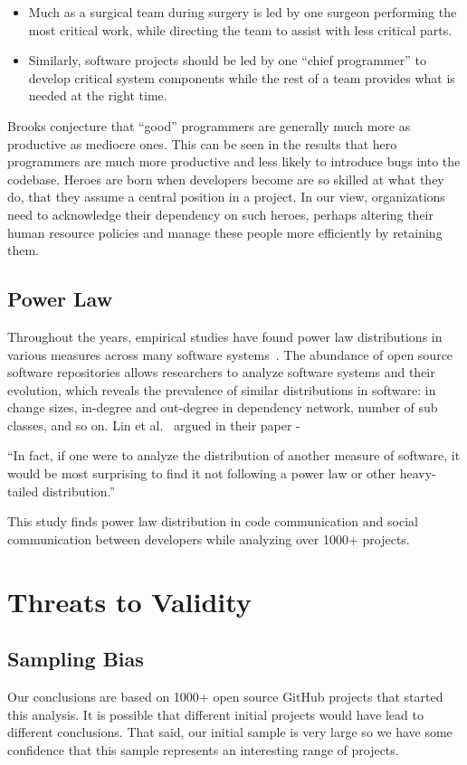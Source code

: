 \documentclass[smallextended]{svjour3}
\begin{document}
\begin{itemize}
  \item  Much as a surgical team during surgery is led by one surgeon performing the most critical work, while directing the team to assist with less critical parts.
  
  \item Similarly, software projects should be led by one ``chief programmer'' to  develop critical system components while the rest of a team provides what is needed at the right time.
\end{itemize}
Brooks conjecture that ``good'' programmers are generally much more as productive as mediocre ones. This can be seen in the results that hero programmers are much more productive and less likely to introduce bugs into the codebase.
Heroes are born when developers become are so skilled at what they do, that  they assume a central position in a project.
In our view,  organizations need to acknowledge their dependency on such heroes, perhaps altering their human resource policies and manage these people more efficiently by retaining them.

\subsection{Power Law}
Throughout the years, empirical studies have found power law distributions in various measures across many software systems~\cite{louridas2008power,concas2007power,wheeldon2003power,lin2015power,madey2002open}. The abundance of open source software repositories allows researchers to  analyze software systems and their evolution, which reveals the prevalence of similar distributions in software: in change sizes, in-degree and out-degree in dependency network, number of sub classes, and so on. Lin et al.~\cite{lin2015power} argued in their paper - 

``In fact, if one were to analyze the distribution of another measure of software, it would be most surprising to find it not following a power law or other heavy-tailed distribution.''

This study finds power law distribution in code communication and social communication between developers while analyzing over 1000+ projects.


\section{Threats to Validity}
\label{sec:Threats to Validity}
  \subsection{Sampling Bias} Our conclusions are based on 1000+ open source GitHub projects that started this analysis.  It is possible that   different initial projects would have lead to different conclusions. That said, our initial sample is very large so we have some confidence that this sample represents an interesting range of projects.  
            
\end{document}
